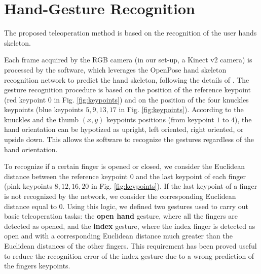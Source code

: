 \documentclass[letterpaper, 10 pt, conference]{ieeeconf}  %
\begin{document}
\section{Hand-Gesture Recognition}\label{sec:HG_recon}

The proposed teleoperation method is based on the recognition of the user hands skeleton.

Each frame acquired by the RGB camera (in our set-up, a Kinect v2 camera) is processed by the software, which leverages the OpenPose hand skeleton recognition network to predict the hand skeleton, following the details of \cite{simon2017hand}.
The gesture recognition procedure is based on the position of the reference keypoint (red keypoint $0$ in Fig. \ref{fig:keypoints}) and on the position of the four knuckles keypoints (blue keypoints $5, 9, 13, 17$ in Fig. \ref{fig:keypoints}). According to the knuckles and the thumb $(x, y)$ keypoints positions (from keypoint $1$ to $4$), the hand orientation can be hypotized as upright, left oriented, right oriented, or upside down. This allows the software to recognize the gestures regardless of the hand orientation. %

To recognize if a certain finger is opened or closed, we consider the Euclidean distance between the reference keypoint $0$ and the last keypoint of each finger (pink keypoints $8, 12, 16, 20$ in Fig. \ref{fig:keypoints}). If the last keypoint of a finger is not recognized by the network, we consider the corresponding Euclidean distance equal to $0$. 
Using this logic, we defined two gestures used to carry out basic teleoperation tasks: the \textbf{open hand} gesture, where all the fingers are detected as opened, and the \textbf{index} gesture, where the index finger is detected as open and with a corresponding Euclidean distance much greater than the Euclidean distances of the other fingers. This requirement has been proved useful to reduce the recognition error of the index gesture due to a wrong prediction of the fingers keypoints.
\end{document}
